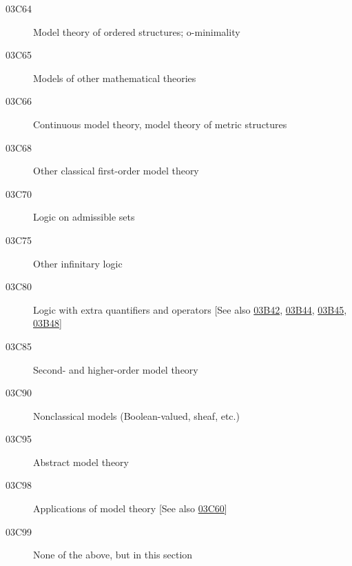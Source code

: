 \begin{description}
\item [03C64]\label{03C64} Model theory of ordered structures; o-minimality
\item [03C65]\label{03C65} Models of other mathematical theories
\item [03C66]\label{03C66} Continuous model theory, model theory of metric structures
\item [03C68]\label{03C68} Other classical first-order model theory
\item [03C70]\label{03C70} Logic on admissible sets
\item [03C75]\label{03C75} Other infinitary logic
\item [03C80]\label{03C80} Logic with extra quantifiers and operators [See also \hyperref[03B42]{03B42}, \hyperref[03B44]{03B44}, \hyperref[03B45]{03B45}, \hyperref[03B48]{03B48}]
\item [03C85]\label{03C85} Second- and higher-order model theory
\item [03C90]\label{03C90} Nonclassical models (Boolean-valued, sheaf, etc.)
\item [03C95]\label{03C95} Abstract model theory
\item [03C98]\label{03C98} Applications of model theory [See also \hyperref[03C60]{03C60}]
\item [03C99]\label{03C99} None of the above, but in this section
\end{description}

